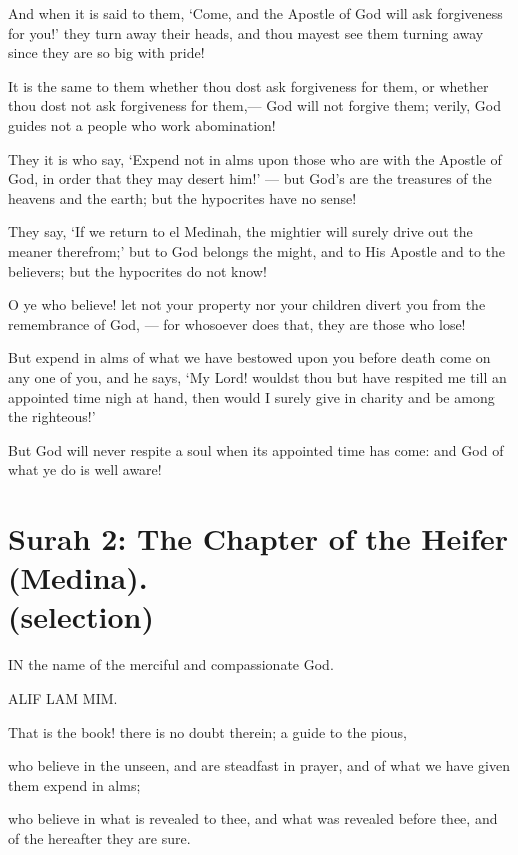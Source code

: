 \documentclass[fontsize=14pt, letterpaper, notitlepage, openany, DIV=12]{scrbook} %
\begin{document}
\noindent[63:5]
And when it is said to them, `Come, and the Apostle of God will ask forgiveness for
you!' they turn away their heads, and thou mayest see them turning away since they are so big
with pride!

\noindent[63:6]
It is the same to them whether thou dost ask forgiveness for them, or whether thou dost
not ask forgiveness for them,--- God will not forgive them; verily, God guides not a people who
work abomination!

\noindent[63:7]
They it is who say, `Expend not in alms upon those who are with the Apostle of God, in
order that they may desert him!' --- but God's are the treasures of the heavens and the earth; but
the hypocrites have no sense!

\noindent[63:8]
They say, `If we return to el Medinah, the mightier will surely drive out the meaner
therefrom;' but to God belongs the might, and to His Apostle and to the believers; but the
hypocrites do not know!

\noindent[63:9]
O ye who believe! let not your property nor your children divert you from the
remembrance of God, --- for whosoever does that, they are those who lose!

\noindent[63:10]
But expend in alms of what we have bestowed upon you before death come on any one of
you, and he says, `My Lord! wouldst thou but have respited me till an appointed time nigh at
hand, then would I surely give in charity and be among the righteous!'

\noindent[63:11]
But God will never respite a soul when its appointed time has come: and God of what ye
do is well aware!


\section[Surah 2: The Chapter of the Heifer (Medina).]{Surah 2: The Chapter of the Heifer (Medina).\\ (selection)}


IN the name of the merciful and compassionate God.

\noindent[2:1]
ALIF LAM MIM.

\noindent[2:2]
That is the book! there is no doubt therein; a guide to the pious,

\noindent[2:3]
who believe in the unseen, and are steadfast in prayer, and of what we have given them
expend in alms;

\noindent[2:4]
who believe in what is revealed to thee, and what was revealed before thee, and of the
hereafter they are sure.
\end{document}
